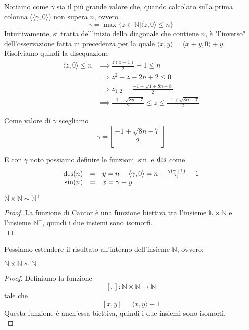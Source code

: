 Notiamo come $\gamma$ sia il più grande valore che, quando calcolato sulla prima colonna ($\langle \gamma, 0 \rangle$) non supera $n$, ovvero
$$ \gamma = \max \{z \in \mathbb{N} | \langle z, 0 \rangle \leq n \} $$
Intuitivamente, si tratta dell'inizio della diagonale che contiene $n$, è "l'inverso" dell'osservazione fatta in precedenza per la quale $ \langle x,y \rangle = \langle x + y,0 \rangle + y $.\\

Risolviamo quindi la disequazione
\begin{align*}
	\langle z, 0 \rangle \leq n & \implies \frac{z(z+1)}{2} + 1 \leq n \\
	& \implies z^2 + z - 2n + 2 \leq 0 \\
	& \implies z_{1,2} = \frac{-1 \pm \sqrt{1 + 8n - 8}}{2} \\
	& \implies \frac{-1 - \sqrt{8n - 7}}{2} \leq z \leq \frac{-1 + \sqrt{8n - 7}}{2} 
\end{align*}

Come valore di $\gamma$ scegliamo
$$ \gamma = \left\lfloor \frac{-1 + \sqrt{8n - 7}}{2} \right\rfloor $$

E con $\gamma$ noto possiamo definire le funzioni $\sin$ e $\operatorname{des}$ come
$$ 
\begin{array}{r c l}
	\operatorname{des}(n) & = & y = n - \langle \gamma, 0 \rangle = n - \frac{\gamma (\gamma + 1)}{2} - 1 \\
	\sin (n) & = & x = \gamma - y
\end{array}
$$

\begin{theor}
	$\mathbb{N} \times \mathbb{N} \sim \mathbb{N}^+$
\end{theor}
\begin{proof}
	La funzione di Cantor è una funzione biettiva tra l'insieme $\mathbb{N} \times \mathbb{N}$ e l'insieme $\mathbb{N}^+$, quindi i due insiemi sono isomorfi.\\
\end{proof}

Possiamo estendere il risultato all'interno dell'insieme $\mathbb{N}$, ovvero:

\begin{theor}
	$\mathbb{N} \times \mathbb{N} \sim \mathbb{N}$
\end{theor}
\begin{proof}
	Definiamo la funzione 
	$$ [,]: \mathbb{N} \times \mathbb{N} \rightarrow \mathbb{N} $$
	tale che
	$$ [x,y] = \langle x,y \rangle - 1$$
	Questa funzione è anch'essa biettiva, quindi i due insiemi sono isomorfi.\\
\end{proof}

